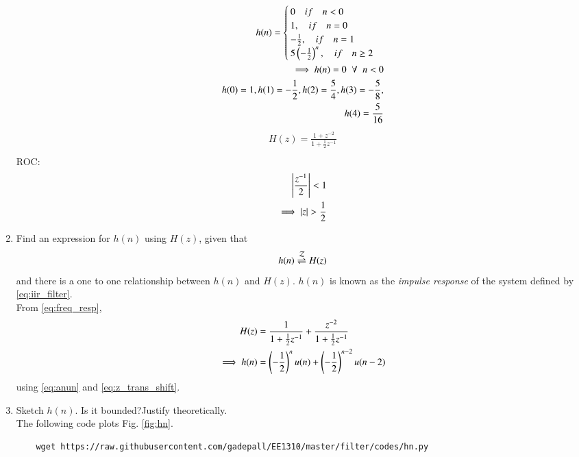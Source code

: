 \documentclass[journal,12pt,twocolumn]{IEEEtran}
\renewcommand\thesection{\arabic{section}}
\begin{document}
\begin{enumerate}[label=\thesection.\arabic*]
\begin{align}
		h(n) = \begin{cases}
		0 \quad if \quad n < 0\\
		1, \quad if \quad n = 0\\
		-\frac{1}{2}, \quad if \quad n = 1\\
		5\left(-\tfrac{1}{2}\right)^{n}, \quad if \quad n \ge 2
	\end{cases}\\	
	\implies h(n)= 0 \;\; \forall \;\; n<0\\
	h(0)=1,h(1)=-\frac{1}{2},h(2)=\frac{5}{4},h(3)=-\frac{5}{8},\\h(4)=\frac{5}{16}
\end{align}
\begin{align}
	H(z) = \frac{1 + z^{-2}}{1 + \frac{1}{2}z^{-1}}\\
\end{align}
ROC: 
\begin{align}
	\left\vert\frac{z^{-1}}{2}\right\vert<1\\
	\implies \left\vert z\right\vert>\frac{1}{2}
\end{align}
\item \label{prob:impulse_resp}
Find an expression for $h(n)$ using $H(z)$, given that 
\begin{equation}
	\label{eq:impulse_resp}
	h(n) \overset{\mathcal{Z}}{ \rightleftharpoons} H(z)
\end{equation}
and there is a one to one relationship between $h(n)$ and $H(z)$. $h(n)$ is known as the {\em impulse response} of the
system defined by \eqref{eq:iir_filter}.
\\
\solution From \eqref{eq:freq_resp},
\begin{align}
	H(z) &= \frac{1}{1 + \frac{1}{2}z^{-1}} + \frac{ z^{-2}}{1 + \frac{1}{2}z^{-1}}
	\\
	\implies h(n) &= \left(-\frac{1}{2}\right)^{n}u(n) + \left(-\frac{1}{2}\right)^{n-2}u(n-2)
\end{align}
using \eqref{eq:anun} and \eqref{eq:z_trans_shift}.
\item Sketch $h(n)$. Is it bounded?Justify theoretically. 
\\
\solution The following code plots Fig. \ref{fig:hn}.
\begin{lstlisting}
	wget https://raw.githubusercontent.com/gadepall/EE1310/master/filter/codes/hn.py
\end{lstlisting}
\begin{figure}[!ht]
	\centering

\end{figure}
\end{enumerate}
\end{document}
